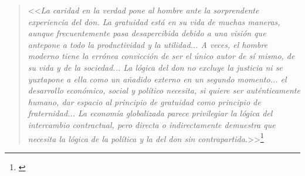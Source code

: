 \begin{quote}
<<\textit{La caridad en la verdad pone al hombre ante la sorprendente experiencia del don. La gratuidad está en su vida de muchas maneras, aunque frecuentemente pasa desapercibida debido a una visión que antepone a todo la productividad y la utilidad... A veces, el hombre moderno tiene la errónea convicción de ser el único autor de sí mismo, de su vida y de la sociedad... La lógica del don no excluye la justicia ni se yuxtapone a ella como un añadido externo en un segundo momento... el desarrollo económico, social y político necesita, si quiere ser auténticamente humano, dar espacio al principio de gratuidad como principio de fraternidad... La economía globalizada parece privilegiar la lógica del intercambio contractual, pero directa o indirectamente demuestra que necesita la lógica de la política y la del don sin contrapartida.}>>\footnote{\citep{BenedictoXVI2009}}
\end{quote}
